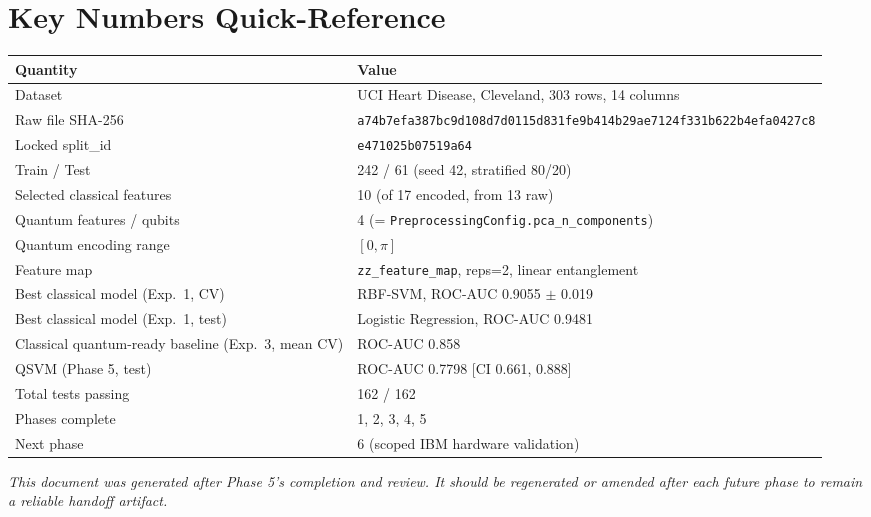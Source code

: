 \documentclass[11pt,a4paper]{article}
\newcommand{\code}[1]{\texttt{\small #1}}
\begin{document}
\section{Key Numbers Quick-Reference}

\begin{tabularx}{\textwidth}{@{}p{5.6cm}Y@{}}
\toprule
\textbf{Quantity} & \textbf{Value} \\
\midrule
Dataset & UCI Heart Disease, Cleveland, 303 rows, 14 columns \\
Raw file SHA-256 & \code{\footnotesize a74b7efa387bc9d108d7d0115d831fe9b414b29ae7124f331b622b4efa0427c8} \\
Locked split\_id & \code{e471025b07519a64} \\
Train / Test & 242 / 61 (seed 42, stratified 80/20) \\
Selected classical features & 10 (of 17 encoded, from 13 raw) \\
Quantum features / qubits & 4 (= \code{PreprocessingConfig.pca\_n\_components}) \\
Quantum encoding range & $[0, \pi]$ \\
Feature map & \code{zz\_feature\_map}, reps=2, linear entanglement \\
Best classical model (Exp.\ 1, CV) & RBF-SVM, ROC-AUC 0.9055 $\pm$ 0.019 \\
Best classical model (Exp.\ 1, test) & Logistic Regression, ROC-AUC 0.9481 \\
Classical quantum-ready baseline (Exp.\ 3, mean CV) & ROC-AUC 0.858 \\
QSVM (Phase 5, test) & ROC-AUC 0.7798 [CI 0.661, 0.888] \\
Total tests passing & 162 / 162 \\
Phases complete & 1, 2, 3, 4, 5 \\
Next phase & 6 (scoped IBM hardware validation) \\
\bottomrule
\end{tabularx}

\vspace{1em}
\noindent\textit{This document was generated after Phase 5's completion and review. It should be regenerated or amended after each future phase to remain a reliable handoff artifact.}
\end{document}
